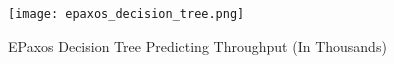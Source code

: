 \begin{figure}
  \texttt{[image: epaxos\_decision\_tree.png]}
  \caption{EPaxos Decision Tree Predicting Throughput (In Thousands)}
  \label{fig:epaxos}
\end{figure}
